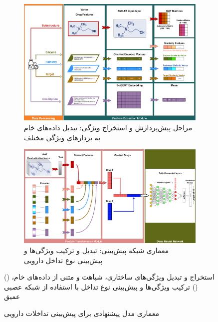 \begin{figure}[!t]
	\centering
	\begin{subfigure}[b]{\textwidth}
		\centering
		\includegraphics[width=\textwidth]{images/proposed-model-1.png}
		\caption[ ]{مراحل پیش‌پردازش و استخراج ویژگی: تبدیل داده‌های خام به بردارهای ویژگی مختلف}
		\label{fig:sub1}
	\end{subfigure}
	\begin{subfigure}[b]{\textwidth}
		\centering
		\includegraphics[width=\textwidth]{images/proposed-model-2.png}
		\caption[ ]{معماری شبکه پیش‌بینی: تبدیل و ترکیب ویژگی‌ها و پیش‌بینی نوع تداخل دارویی}
		\label{fig:sub2}
	\end{subfigure}
	\caption{معماری مدل پیشنهادی برای پیش‌بینی تداخلات دارویی} () استخراج و تبدیل ویژگی‌های ساختاری، شباهت و متنی از داده‌های خام، () ترکیب ویژگی‌ها و پیش‌بینی نوع تداخل با استفاده از شبکه عصبی عمیق
	\label{fig:model_architecture}
\end{figure}

